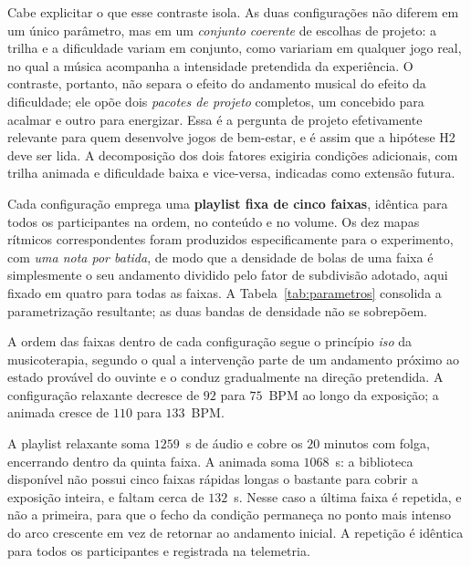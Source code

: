 Cabe explicitar o que esse contraste isola. As duas configurações não diferem em um único parâmetro, mas em um \emph{conjunto coerente} de escolhas de projeto: a trilha e a dificuldade variam em conjunto, como variariam em qualquer jogo real, no qual a música acompanha a intensidade pretendida da experiência. O contraste, portanto, não separa o efeito do andamento musical do efeito da dificuldade; ele opõe dois \emph{pacotes de projeto} completos, um concebido para acalmar e outro para energizar. Essa é a pergunta de projeto efetivamente relevante para quem desenvolve jogos de bem-estar, e é assim que a hipótese H2 deve ser lida. A decomposição dos dois fatores exigiria condições adicionais, com trilha animada e dificuldade baixa e vice-versa, indicadas como extensão futura.

Cada configuração emprega uma \textbf{playlist fixa de cinco faixas}, idêntica para todos os participantes na ordem, no conteúdo e no volume. Os dez mapas rítmicos correspondentes foram produzidos especificamente para o experimento, com \emph{uma nota por batida}, de modo que a densidade de bolas de uma faixa é simplesmente o seu andamento dividido pelo fator de subdivisão adotado, aqui fixado em quatro para todas as faixas. A Tabela~\ref{tab:parametros} consolida a parametrização resultante; as duas bandas de densidade não se sobrepõem.

A ordem das faixas dentro de cada configuração segue o princípio \textit{iso} da musicoterapia, segundo o qual a intervenção parte de um andamento próximo ao estado provável do ouvinte e o conduz gradualmente na direção pretendida. A configuração relaxante decresce de $92$ para $75$~BPM ao longo da exposição; a animada cresce de $110$ para $133$~BPM.

A playlist relaxante soma $1259$~s de áudio e cobre os $20$ minutos com folga, encerrando dentro da quinta faixa. A animada soma $1068$~s: a biblioteca disponível não possui cinco faixas rápidas longas o bastante para cobrir a exposição inteira, e faltam cerca de $132$~s. Nesse caso a última faixa é repetida, e não a primeira, para que o fecho da condição permaneça no ponto mais intenso do arco crescente em vez de retornar ao andamento inicial. A repetição é idêntica para todos os participantes e registrada na telemetria.

